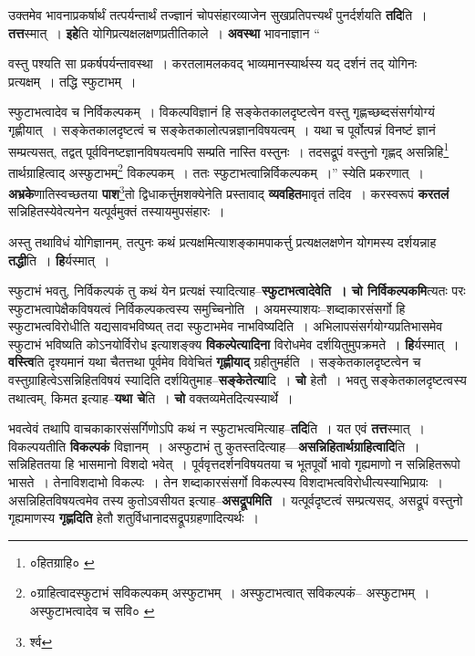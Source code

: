 \documentclass[article,12pt,a4paper]{memoir}
\begin{document}
	  \pstart उक्तमेव भावनाप्रकर्षार्थं तत्पर्यन्तार्थं तज्ज्ञानं चोपसंहारव्याजेन सुखप्रतिपत्त्यर्थं पुनर्दर्शयति \textbf{तदि}ति । \textbf{तत्त}स्मात् । \textbf{इहे}ति योगिप्रत्यक्षलक्षणप्रतीतिकाले । \textbf{अवस्था} भावनाज्ञान  \leavevmode{} “
	  
	वस्तु पश्यति सा प्रकर्षपर्यन्तावस्था । करतलामलकवद् भाव्यमानस्यार्थस्य यद् दर्शनं तद् योगिनः प्रत्यक्षम् । तद्धि स्फुटाभम् । 
	  
	स्फुटाभत्वादेव च निर्विकल्पकम् । विकल्पविज्ञानं हि सङ्केतकालदृष्टत्वेन वस्तु गृह्णच्छब्दसंसर्गयोग्यं गृह्णीयात् । सङ्केतकालदृष्टत्वं च सङ्केतकालोत्पन्नज्ञानविषयत्वम् । यथा च पूर्वोत्पन्नं विनष्टं ज्ञानं सम्प्रत्यसत्, तद्वत् पूर्वविनष्टज्ञानविषयत्वमपि सम्प्रति नास्ति वस्तुनः । तदसद्रूपं वस्तुनो गृह्णद् असन्निहि\footnote{०हितग्राहि० \cite{dp-msB} \cite{dp-msC}} तार्थग्राहित्वाद् अस्फुटाभम्\footnote{०ग्राहित्वादस्फुटाभं सविकल्पकम् \cite{dp-msC} अस्फुटाभम् । अस्फुटाभत्वात् सविकल्पकं--\cite{dp-msA} \cite{dp-edP} अस्फुटाभम् । अस्फुटाभत्वादेव च सवि० \cite{dp-msD} \cite{dp-msB} \cite{dp-edH} \cite{dp-edE} \cite{dp-edN}} विकल्पकम् । ततः स्फुटाभत्वान्निर्विकल्पकम् ।” स्येति प्रकरणात् । \textbf{अभ्रके}णातिस्वच्छतया \textbf{पाश}\footnote{र्श्व}तो द्विधाकर्त्तुमशक्येनेति प्रस्तावाद् \textbf{व्यवहित}मावृतं तदिव । करस्वरूपं \textbf{करतलं} सन्निहितस्येवेत्यनेन यत्पूर्वमुक्तं\leavevmode{} तस्यायमुपसंहारः ।
	\pend
      

	  \pstart अस्तु तथाविधं योगिज्ञानम्, तत्पुनः कथं प्रत्यक्षमित्याशङ्कामपाकर्त्तु प्रत्यक्षलक्षणेन योगमस्य दर्शयन्नाह \textbf{तद्धी}ति । \textbf{हि}र्यस्मात् ।
	\pend
      

	  \pstart स्फुटाभं भवतु, निर्विकल्पकं तु कथं येन प्रत्यक्षं स्यादित्याह--\textbf{स्फुटाभत्वादेवेति । चो निर्विकल्पकमि}त्यतः परः स्फुटाभत्वापेक्षैकविषयत्वं निर्विकल्पकत्वस्य समुच्चिनोति । अयमस्याशयः--शब्दाकारसंसर्गो हि स्फुटाभत्वविरोधीति यद्यसावभविष्यत् तदा स्फुटाभमेव नाभविष्यदिति । अभिलापसंसर्गयोग्यप्रतिभासमेव स्फुटाभं भविष्यति कोऽनयोर्विरोध इत्याशङ्क्य \textbf{विकल्पेत्यादिना} विरोधमेव दर्शयितुमुपक्रमते । \textbf{हि}र्यस्मात् । \textbf{वस्त्वि}ति दृश्यमानं यथा चैतत्तथा पूर्वमेव विवेचितं \textbf{गृह्णीयाद्} ग्रहीतुमर्हति । सङ्केतकालदृष्टत्वेन च वस्तुग्राहित्वेऽसन्निहितविषयं स्यादिति दर्शयितुमाह--\textbf{सङ्केतेत्या}दि । \textbf{चो} हेतौ । भवतु सङ्केतकालदृष्टत्वस्य तथात्वम्, किमत इत्याह--\textbf{यथा चे}ति । \textbf{चो} वक्तव्यमेतदित्यस्यार्थे ।
	\pend
      

	  \pstart भवत्वेवं तथापि वाचकाकारसंसर्गिणोऽपि कथं न स्फुटाभत्वमित्याह--\textbf{तदि}ति । यत एवं \textbf{तत्त}स्मात् । विकल्पयतीति \textbf{विकल्पकं} विज्ञानम् । अस्फुटाभं तु कुतस्तदित्याह—\textbf{असन्निहितार्थग्राहित्वादि}ति । सन्निहिततया हि भासमानो विशदो भवेत् । पूर्ववृत्तदर्शनविषयतया च भूतपूर्वो भावो गृह्यमाणो न सन्निहितरूपो भासते । तेनाविशदाभो विकल्पः । तेन शब्दाकारसंसर्गो विकल्पस्य विशदाभत्वविरोधीत्यस्याभिप्रायः । असन्निहितविषयत्वमेव तस्य कुतोऽवसीयत इत्याह--\textbf{असद्रूपमिति} । यत्पूर्वदृष्टत्वं सम्प्रत्यसद्, असद्रूपं वस्तुनो गृह्यमाणस्य \textbf{गृह्णदिति} हेतौ शतुर्विधानादसद्रूपग्रहणादित्यर्थः ।
	\pend
      
\end{document}
